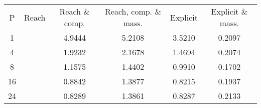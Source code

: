 \documentclass[a4paper]{article}
\begin{document}
\begin{table}
\begin{tabular}{c | c | c | c | c | c}
P & Reach & Reach \& comp. & Reach, comp. \& mass. & Explicit & Explicit \& mass. \\
1   &     & 4.9444  & 5.2108  & 3.5210  & 0.2097  \\
4   &     & 1.9232  & 2.1678  & 1.4694  & 0.2074  \\
8   &     & 1.1575  & 1.4402  & 0.9910  & 0.1702  \\
16  &     & 0.8842  & 1.3877  & 0.8215  & 0.1937  \\
24  &     & 0.8289  & 1.3861  & 0.8287  & 0.2133  \\
\end{tabular}
\end{table}
\end{document}
